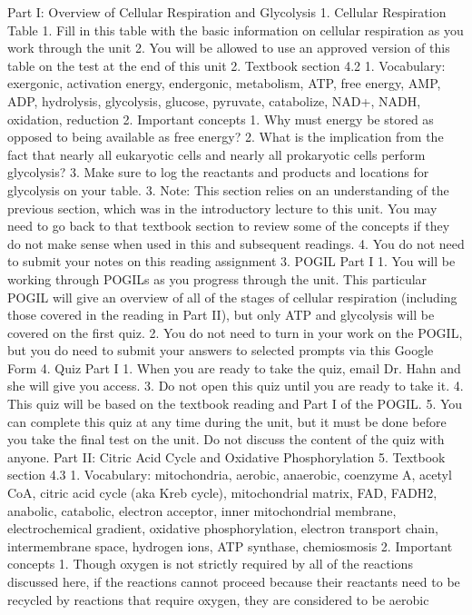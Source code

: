 Part I: Overview of Cellular Respiration and Glycolysis
1. Cellular Respiration Table 
   1. Fill in this table with the basic information on cellular respiration as you work through the unit
   2. You will be allowed to use an approved version of this table on the test at the end of this unit
2. Textbook section 4.2
   1. Vocabulary: exergonic, activation energy, endergonic, metabolism, ATP, free energy, AMP, ADP, hydrolysis, glycolysis, glucose, pyruvate, catabolize, NAD+, NADH, oxidation, reduction
   2. Important concepts
      1. Why must energy be stored as opposed to being available as free energy?
      2. What is the implication from the fact that nearly all eukaryotic cells and nearly all prokaryotic cells perform glycolysis?
      3. Make sure to log the reactants and products and locations for glycolysis on your table.
   3. Note: This section relies on an understanding of the previous section, which was in the introductory lecture to this unit. You may need to go back to that textbook section to review some of the concepts if they do not make sense when used in this and subsequent readings.
   4. You do not need to submit your notes on this reading assignment
3. POGIL Part I 
   1. You will be working through POGILs as you progress through the unit. This particular POGIL will give an overview of all of the stages of cellular respiration (including those covered in the reading in Part II), but only ATP and glycolysis will be covered on the first quiz.
   2. You do not need to turn in your work on the POGIL, but you do need to submit your answers to selected prompts via this Google Form
4. Quiz Part I 
   1. When you are ready to take the quiz, email Dr. Hahn and she will give you access.
   3. Do not open this quiz until you are ready to take it.
   4. This quiz will be based on the textbook reading and Part I of the POGIL. 
   5. You can complete this quiz at any time during the unit, but it must be done before you take the final test on the unit. Do not discuss the content of the quiz with anyone.
Part II: Citric Acid Cycle and Oxidative Phosphorylation
5. Textbook section 4.3
   1. Vocabulary: mitochondria, aerobic, anaerobic, coenzyme A, acetyl CoA, citric acid cycle (aka Kreb cycle), mitochondrial matrix, FAD, FADH2, anabolic, catabolic, electron acceptor, inner mitochondrial membrane, electrochemical gradient, oxidative phosphorylation, electron transport chain, intermembrane space, hydrogen ions, ATP synthase, chemiosmosis 
   2. Important concepts
      1. Though oxygen is not strictly required by all of the reactions discussed here, if the reactions cannot proceed because their reactants need to be recycled by reactions that require oxygen, they are considered to be aerobic
